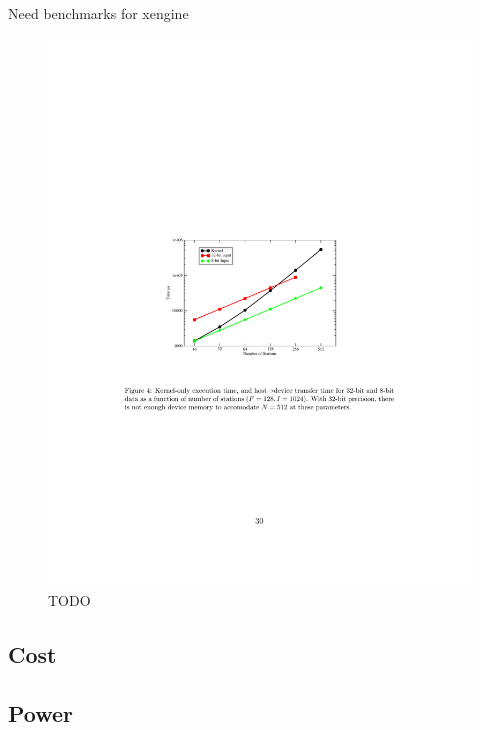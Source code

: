 Need benchmarks for xengine
\begin{figure}[ht!]
  \centering
    \includegraphics[width=\textwidth]{Images/C6/gpuxperformance.pdf}
  \caption{TODO}
  \label{fig: C6/gpuxperformance.pdf}
\end{figure}


\subsection{Cost}
\subsection{Power}
